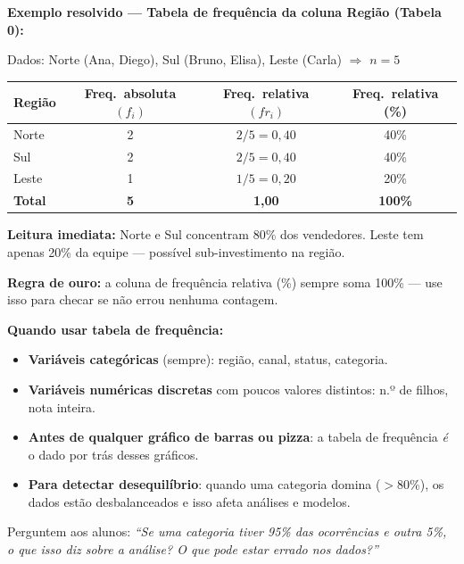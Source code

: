 \begin{SolvedBox}
\textbf{Exemplo resolvido — Tabela de frequência da coluna Região (Tabela 0):}

Dados: Norte (Ana, Diego), Sul (Bruno, Elisa), Leste (Carla) $\Rightarrow$ $n = 5$

\begin{center}
\begin{tabular}{|l|c|c|c|}
\hline
\textbf{Região} & \textbf{Freq.~absoluta} $(f_i)$ & \textbf{Freq.~relativa} $(fr_i)$ & \textbf{Freq.~relativa (\%)} \\
\hline
Norte & 2 & $2/5 = 0{,}40$ & 40\% \\
Sul   & 2 & $2/5 = 0{,}40$ & 40\% \\
Leste & 1 & $1/5 = 0{,}20$ & 20\% \\
\hline
\textbf{Total} & \textbf{5} & \textbf{1,00} & \textbf{100\%} \\
\hline
\end{tabular}
\end{center}

\textbf{Leitura imediata:} Norte e Sul concentram 80\% dos vendedores.
Leste tem apenas 20\% da equipe — possível sub-investimento na região.

\textbf{Regra de ouro:} a coluna de frequência relativa (\%) sempre
soma 100\% — use isso para checar se não errou nenhuma contagem.
\end{SolvedBox}

\begin{BoardBox}
\textbf{Quando usar tabela de frequência:}
\begin{itemize}
  \item \textbf{Variáveis categóricas} (sempre): região, canal, status, categoria.
  \item \textbf{Variáveis numéricas discretas} com poucos valores distintos: n.º de filhos, nota inteira.
  \item \textbf{Antes de qualquer gráfico de barras ou pizza}: a tabela de frequência
  \emph{é} o dado por trás desses gráficos.
  \item \textbf{Para detectar desequilíbrio}: quando uma categoria domina ($> 80\%$),
  os dados estão desbalanceados e isso afeta análises e modelos.
\end{itemize}
\end{BoardBox}

Perguntem aos alunos: \textit{``Se uma categoria tiver 95\% das ocorrências
e outra 5\%, o que isso diz sobre a análise? O que pode estar errado nos dados?''}

